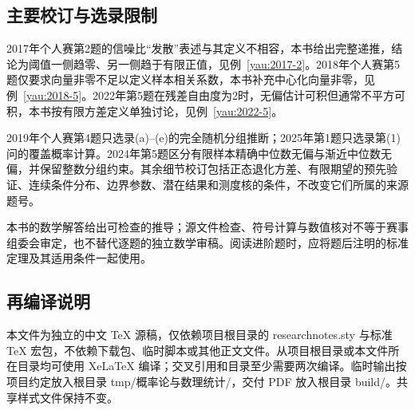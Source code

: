 \documentclass[UTF8,12pt,a4paper,fontset=fandol]{ctexbook}
\begin{document}
\subsection*{主要校订与选录限制}

2017年个人赛第2题的信噪比“发散”表述与其定义不相容，本书给出完整递推，结论为阈值一侧趋零、另一侧趋于有限正值，见例~\ref{yau:2017-2}。2018年个人赛第5题仅要求向量非零不足以定义样本相关系数，本书补充中心化向量非零，见例~\ref{yau:2018-5}。2022年第5题在残差自由度为2时，无偏估计可积但通常不平方可积，本书按有限方差定义单独讨论，见例~\ref{yau:2022-5}。

2019年个人赛第4题只选录(a)--(e)的完全随机分组推断；2025年第1题只选录第(1)问的覆盖概率计算。2024年第5题区分有限样本精确中位数无偏与渐近中位数无偏，并保留整数分组约束。其余细节校订包括正态退化方差、有限期望的预先验证、连续条件分布、边界参数、潜在结果和测度核的条件，不改变它们所属的来源题号。

本书的数学解答给出可检查的推导；源文件检查、符号计算与数值核对不等于赛事组委会审定，也不替代逐题的独立数学审稿。阅读进阶题时，应将题后注明的标准定理及其适用条件一起使用。

\subsection*{再编译说明}

本文件为独立的中文 TeX 源稿，仅依赖项目根目录的 researchnotes.sty 与标准 TeX 宏包，不依赖下载包、临时脚本或其他正文文件。从项目根目录或本文件所在目录均可使用 XeLaTeX 编译；交叉引用和目录至少需要两次编译。临时输出按项目约定放入根目录 tmp/概率论与数理统计/，交付 PDF 放入根目录 build/。共享样式文件保持不变。
\end{document}
